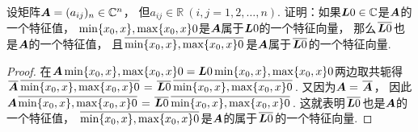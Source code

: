 \begin{example}
设矩阵\(\A = (a_{ij})_n \in \mathbb{C}^n\)，
但\(a_{ij} \in \mathbb{R}\ (i,j=1,2,\dotsc,n)\).
证明：如果\(\L0\in\mathbb{C}\)是\(\A\)的一个特征值，
\(\X0\)是\(\A\)属于\(\L0\)的一个特征向量，
那么\(\complexconjugate{\L0}\)也是\(\A\)的一个特征值，
且\(\complexconjugate{\X0}\)是\(\A\)属于\(\complexconjugate{\L0}\)的一个特征向量.
\begin{proof}
在\(\A\X0=\L0\X0\)两边取共轭得
\(\complexconjugate{\A}\complexconjugate{\X0}
=\complexconjugate{\L0}\complexconjugate{\X0}\).
又因为\(\A=\complexconjugate{\A}\)，
因此\(\A\complexconjugate{\X0}=\complexconjugate{\L0}\complexconjugate{\X0}\).
这就表明\(\complexconjugate{\L0}\)也是\(\A\)的一个特征值，
\(\complexconjugate{\X0}\)是\(\A\)的属于\(\complexconjugate{\L0}\)的一个特征向量.
\end{proof}
\end{example}

